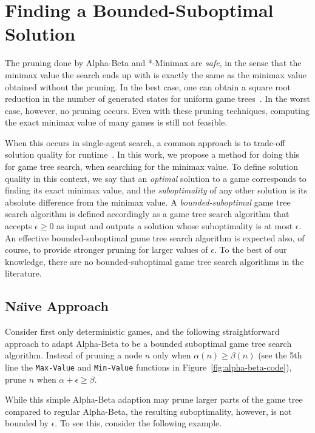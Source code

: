 \documentclass[runningheads]{llncs}
\begin{document}
\section{Finding a Bounded-Suboptimal Solution}

The pruning done by Alpha-Beta and *-Minimax are \emph{safe}, in the sense that the minimax value the search ends up with is exactly the same as the minimax value obtained without the pruning. In the best case, one can obtain a square root reduction in the number of generated states for uniform game trees~\cite{knuth1975analysis,ballard1983minimax}. In the worst case, however, no pruning occurs. Even with these pruning techniques, computing the exact minimax value of many games is still not feasible. %

When this occurs in single-agent search, a common approach is to trade-off solution quality for runtime~\cite{pohl1970heuristic,thayer2011bounded,gilon2016dynamic}. 
In this work, we propose a method for doing this for game tree search, when searching for the minimax value. 
To define solution quality in this context, we say that an  \emph{optimal} solution to a game corresponds to finding its exact minimax value, and the \emph{suboptimality} of any other solution is its absolute difference from the minimax value. %
A \emph{bounded-suboptimal} game tree search algorithm is defined accordingly as a game tree search algorithm that accepts $\epsilon\geq 0$ as input and outputs a solution whose suboptimality is at most $\epsilon$. 
An effective bounded-suboptimal game tree search algorithm is expected also, of course, to provide stronger pruning for larger values of $\epsilon$. To the best of our knowledge, there are no bounded-suboptimal game tree search algorithms in the literature. 

\subsection{Na\"{\i}ve Approach}
Consider first only deterministic games, and the following straightforward approach to adapt Alpha-Beta to be a bounded suboptimal  game tree search algorithm. Instead of pruning a node $n$ only when $\alpha(n)\geq \beta(n)$ (see the 5th line the {\tt Max-Value} and {\tt Min-Value} functions in Figure~\ref{fig:alpha-beta-code}), prune $n$  when $\alpha+\epsilon\geq \beta$. 

While this simple Alpha-Beta adaption may prune larger parts of the game tree compared to regular Alpha-Beta, the resulting suboptimality, however, is not bounded by $\epsilon$.
To see this, consider the following example. 
\end{document}

